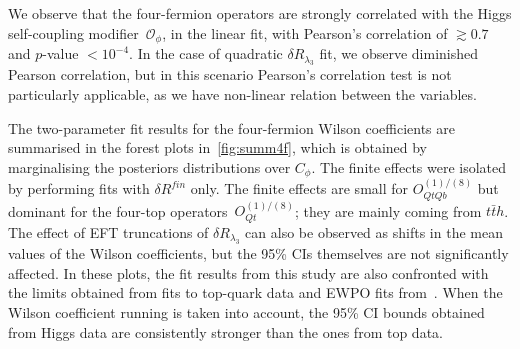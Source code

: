 	We observe that the four-fermion operators are strongly correlated with the Higgs self-coupling modifier~$\mathcal O_\phi$, in the linear fit, with Pearson's correlation of $ \gtrsim 0.7$ and $p$-value $< 10^{-4}$.  In the case of quadratic $\delta R_{\lambda_3}$ fit, we observe diminished Pearson correlation, but in this scenario Pearson's correlation test is not particularly applicable, as we have non-linear relation between the variables.
	\par The two-parameter fit results for the four-fermion Wilson coefficients are summarised in the forest plots in~\autoref{fig:summ4f}, which is obtained by marginalising the posteriors distributions over $C_\phi$. The finite effects were isolated by performing fits with $\delta R^{fin}$ only. The finite effects are small for  $O_{QtQb}^{(1)/(8)}$ but dominant for the four-top operators~$O_{Qt}^{(1)/(8)}$; they are mainly coming from $t\bar t h$.    The effect of EFT truncations of $\delta R_{\lambda_3}$ can also be observed as shifts in the mean values of the Wilson coefficients, but the 95\% CIs themselves are not significantly affected.  In these plots, the fit results from this study are also confronted with the limits obtained from fits to top-quark data \cite{Ethier:2021bye, Ellis:2020unq, Hartland:2019bjb,Brivio:2019ius,DHondt:2018cww, Zhang:2017mls} and EWPO fits from~\cite{Dawson:2022bxd}. When the Wilson coefficient running is taken into account, the 95\% CI  bounds obtained from Higgs data are consistently stronger than the ones from top data.
